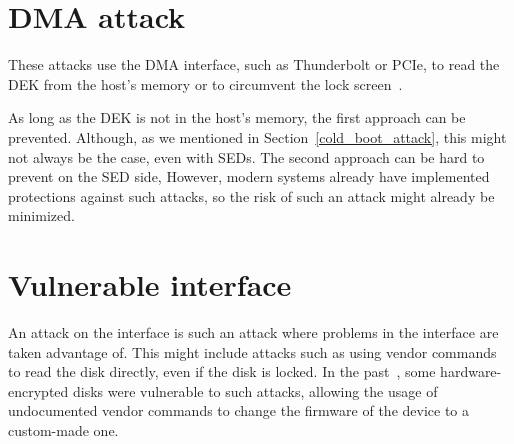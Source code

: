 

\section{DMA attack}

These attacks use the DMA interface, such as Thunderbolt or PCIe, to read the DEK from the host's memory or to circumvent the lock screen~\cite{self_decrypting_risks}. 

\REPLACEME

As long as the DEK is not in the host's memory, the first approach can be prevented. Although, as we mentioned in Section~\ref{cold_boot_attack}, this might not always be the case, even with SEDs.
The second approach can be hard to prevent on the SED side, 
However, modern systems already have implemented protections against such attacks, so the risk of such an attack might already be minimized.


\section{Vulnerable interface}

An attack on the interface is such an attack where problems in the interface are taken advantage of.
This might include attacks such as using vendor commands to read the disk directly, even if the disk is locked. In the past~\cite{self_encrypting_deception}, some hardware-encrypted disks were vulnerable to such attacks, allowing the usage of undocumented vendor commands to change the firmware of the device to a custom-made one. %

